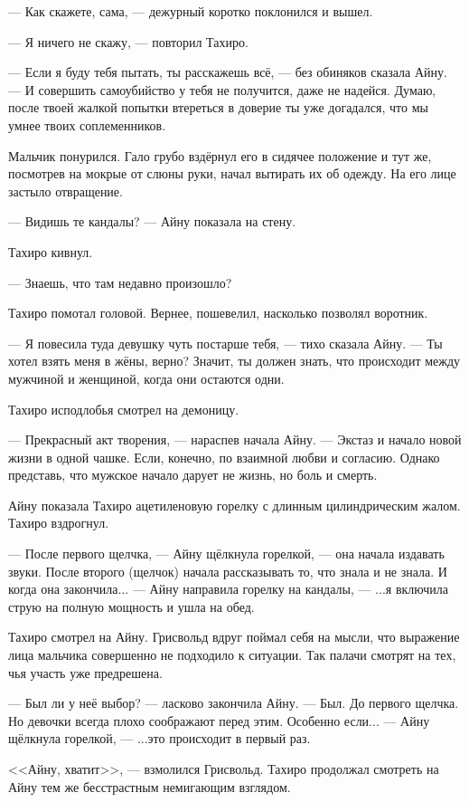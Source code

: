 --- Как скажете, сама, --- дежурный коротко поклонился и вышел.

--- Я ничего не скажу, --- повторил Тахиро.

--- Если я буду тебя пытать, ты расскажешь всё, --- без обиняков сказала Айну.
--- И совершить самоубийство у тебя не получится, даже не надейся.
Думаю, после твоей жалкой попытки втереться в доверие ты уже догадался, что мы умнее твоих соплеменников.

Мальчик понурился.
Гало грубо вздёрнул его в сидячее положение и тут же, посмотрев на мокрые от слюны руки, начал вытирать их об одежду.
На его лице застыло отвращение.

--- Видишь те кандалы? --- Айну показала на стену.

Тахиро кивнул.

--- Знаешь, что там недавно произошло?

Тахиро помотал головой.
Вернее, пошевелил, насколько позволял воротник.

--- Я повесила туда девушку чуть постарше тебя, --- тихо сказала Айну.
--- Ты хотел взять меня в жёны, верно?
Значит, ты должен знать, что происходит между мужчиной и женщиной, когда они остаются одни.

Тахиро исподлобья смотрел на демоницу.

--- Прекрасный акт творения, --- нараспев начала Айну.
--- Экстаз и начало новой жизни в одной чашке.
Если, конечно, по взаимной любви и согласию.
Однако представь, что мужское начало дарует не жизнь, но боль и смерть.

Айну показала Тахиро ацетиленовую горелку с длинным цилиндрическим жалом.
Тахиро вздрогнул.

--- После первого щелчка, --- Айну щёлкнула горелкой, --- она начала издавать звуки.
После второго (щелчок) начала рассказывать то, что знала и не знала.
И когда она закончила... --- Айну направила горелку на кандалы, --- ...я включила струю на полную мощность и ушла на обед.

Тахиро смотрел на Айну.
Грисвольд вдруг поймал себя на мысли, что выражение лица мальчика совершенно не подходило к ситуации.
Так палачи смотрят на тех, чья участь уже предрешена.

--- Был ли у неё выбор? --- ласково закончила Айну.
--- Был.
До первого щелчка.
Но девочки всегда плохо соображают перед этим.
Особенно если... --- Айну щёлкнула горелкой, --- ...это происходит в первый раз.

<<Айну, хватит>>, --- взмолился Грисвольд.
Тахиро продолжал смотреть на Айну тем же бесстрастным немигающим взглядом.

